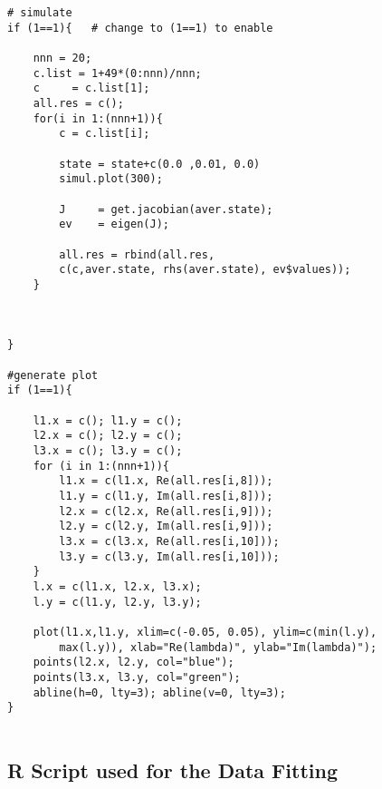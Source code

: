 \begin{lstlisting}
# simulate 	
if (1==1){   # change to (1==1) to enable
	
	nnn = 20;
	c.list = 1+49*(0:nnn)/nnn;
	c     = c.list[1];
	all.res = c();
	for(i in 1:(nnn+1)){
		c = c.list[i];
		
		state = state+c(0.0 ,0.01, 0.0)
		simul.plot(300); 
			
		J     = get.jacobian(aver.state);
		ev    = eigen(J);
		
		all.res = rbind(all.res, 
		c(c,aver.state, rhs(aver.state), ev$values));
	}
		
	
		
}
	
#generate plot	
if (1==1){
	
	l1.x = c(); l1.y = c();
	l2.x = c(); l2.y = c();
	l3.x = c(); l3.y = c();
	for (i in 1:(nnn+1)){
		l1.x = c(l1.x, Re(all.res[i,8]));  
		l1.y = c(l1.y, Im(all.res[i,8]));
		l2.x = c(l2.x, Re(all.res[i,9]));  
		l2.y = c(l2.y, Im(all.res[i,9]));
		l3.x = c(l3.x, Re(all.res[i,10])); 
		l3.y = c(l3.y, Im(all.res[i,10]));
	}
	l.x = c(l1.x, l2.x, l3.x);
	l.y = c(l1.y, l2.y, l3.y);
		
	plot(l1.x,l1.y, xlim=c(-0.05, 0.05), ylim=c(min(l.y), 
		max(l.y)), xlab="Re(lambda)", ylab="Im(lambda)");
	points(l2.x, l2.y, col="blue");
	points(l3.x, l3.y, col="green");
	abline(h=0, lty=3); abline(v=0, lty=3);
}
	
\end{lstlisting}

\subsection{R Script used for the Data Fitting}

\begin{lstlisting}
\end{lstlisting}

